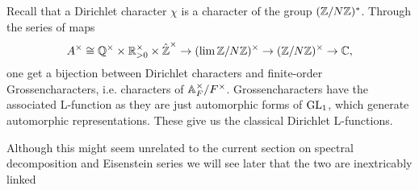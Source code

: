 \begin{example}
    Recall that a Dirichlet character \(\chi\) is a character of the group \((\Z/N\Z)^*\). Through the series of maps 
    \[A^\times \cong \Q^\times \times \R_{>0}^\times \times \hat{\Z}^\times \to (\lim \Z/N\Z)^\times \to (\Z/N\Z)^\times \to \C,\]
    one get a bijection between Dirichlet characters and finite-order Grossencharacters, i.e. characters of \(\A_F^\times/F^\times\).
    Grossencharacters have the associated L-function as they are just automorphic forms of \(\operatorname{GL}_1\), which generate automorphic representations. These give us the classical Dirichlet L-functions.
\end{example}
Although this might seem unrelated to the current section on spectral decomposition and Eisenstein series we will see later that the two are inextricably linked
